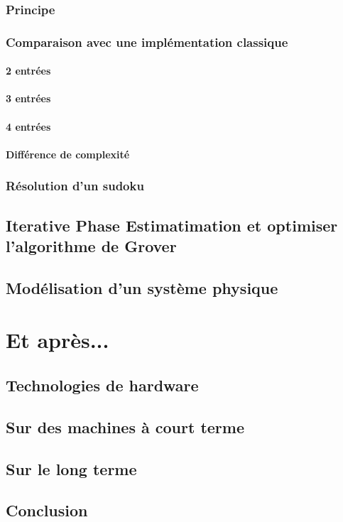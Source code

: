 \documentclass[11pt]{report}
\begin{document}
\section{Principe}
\lipsum[2-4]

\section{Comparaison avec une implémentation classique}
\subsection{2 entrées}
\lipsum[2-4]

\subsection{3 entrées}
\lipsum[2-4]

\subsection{4 entrées}
\lipsum[2-4]

\subsection{Différence de complexité}
\lipsum[2-4]

\section{Résolution d'un sudoku}
\lipsum[2-4]

\chapter{Iterative Phase Estimatimation et optimiser l'algorithme de Grover}
\lipsum[2-4]

\chapter{Modélisation d'un système physique}
\lipsum[2-4]

\part{Et après...}
\chapter{Technologies de hardware}
\lipsum[2-4]

\chapter{Sur des machines à court terme}
\lipsum[2-4]

\chapter{Sur le long terme}
\lipsum[2-4]

\chapter{Conclusion}

\clearpage
\nocite{*}
\printbibliography
\end{document}

